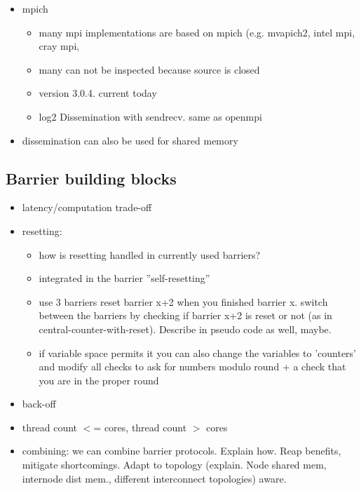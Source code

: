 \documentclass[a4paper, 10pt]{article}
\begin{document}
\begin{itemize}
\begin{itemize}
		\end{itemize}
	\item mpich
		\begin{itemize}
			\item many mpi implementations are based on mpich (e.g. mvapich2, intel mpi, cray mpi,
			\item many can not be inspected because source is closed
			\item version 3.0.4. current today
			\item log2 Dissemination with sendrecv. same as openmpi
		\end{itemize}
	\item dissemination can also be used for shared memory\cite{hoefler2013}
\end{itemize}

\subsection{Barrier building blocks}
\label{ssec:building-blocks}
\begin{itemize}
	\item latency/computation trade-off
	\item resetting:
		\begin{itemize}
			\item how is resetting handled in currently used barriers?
			\item integrated in the barrier ''self-resetting''
			\item use 3 barriers reset barrier x+2 when you finished barrier x. switch between the barriers by checking if barrier x+2 is reset or not (as in central-counter-with-reset). Describe in pseudo code as well, maybe.
			\item if variable space permits it you can also change the variables to 'counters' and modify all checks to ask for numbers modulo round + a check that you are in the proper round
		\end{itemize}
	\item back-off
	\item thread count $<$= cores, thread count $>$ cores
	\item combining: we can combine barrier protocols. Explain how. Reap benefits, mitigate shortcomings. Adapt to topology (explain. Node shared mem, internode dist mem., different interconnect topologies) aware.
\end{itemize}
\end{document}
